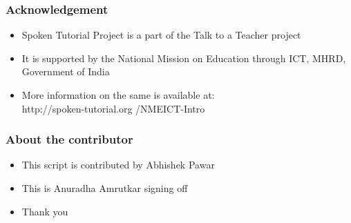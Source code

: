\documentclass[17pt]{beamer}
\begin{document}
\begin{frame}
  \frametitle{Acknowledgement}
  \begin{itemize}[<+-|alert@+>]
  \item Spoken Tutorial Project is a part of the Talk to a Teacher project
  \item It is supported by the National Mission on Education through ICT, MHRD, Government of India
\item  More information on the same is available at:\\  { \color{blue} http://spoken-tutorial.org /NMEICT-Intro}
  \end{itemize}
\end{frame}


\begin{frame}
\frametitle{About the contributor}
\begin{itemize}[<+-|alert@+>]

\item This script is contributed by Abhishek Pawar
\item This is Anuradha Amrutkar signing off
\item Thank you
\end{itemize}
\end{frame}
\end{document}
